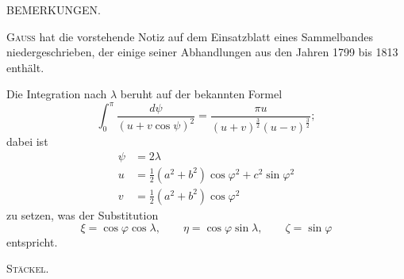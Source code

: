 %
\begin{center}BEMERKUNGEN.\end{center}

\textsc{Gauss} hat die vorstehende Notiz auf dem Einsatzblatt eines Sammelbandes niedergeschrieben, der einige seiner Abhandlungen aus den Jahren 1799 bis 1813 enthält.

Die Integration nach $\lambda$ beruht auf der bekannten Formel
\[
\int_0^\pi\frac{d\psi}{(u+v\cos\psi)^2}=\frac{\pi u}{(u+v)^{\frac32}(u-v)^{\frac32}};
\]
dabei ist
\[
\begin{aligned}
\psi&=2\lambda\\
u&=\tfrac12(a^2+b^2)\cos\varphi^2+c^2\sin\varphi^2\\
v&=\tfrac12(a^2+b^2)\cos\varphi^2
\end{aligned}
\]
zu setzen, was der Substitution
\[
\xi=\cos\varphi\cos\lambda,\qquad\eta=\cos\varphi\sin\lambda,\qquad\zeta=\sin\varphi
\]
entspricht.\par\nobreak\hfill\textsc{Stäckel.}\par
